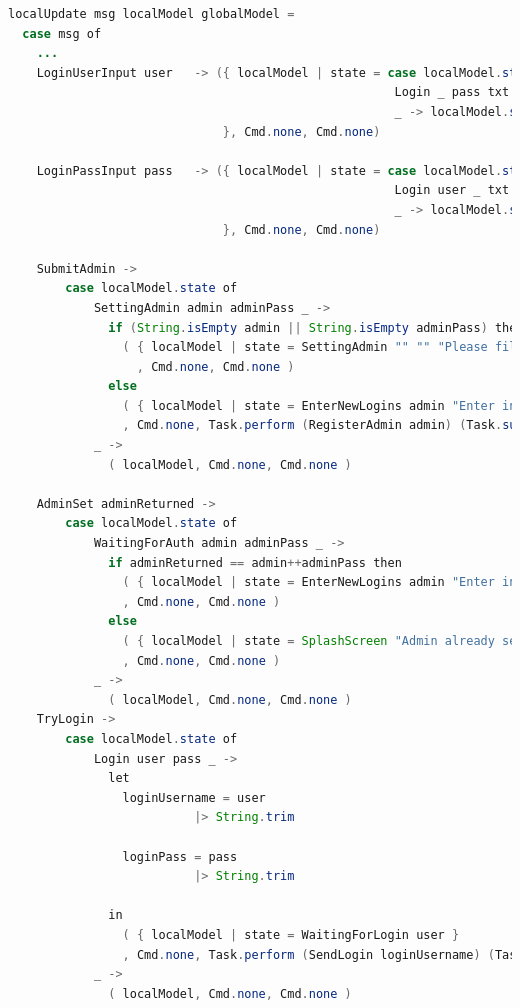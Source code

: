 \begin{lstlisting}[language=Java, caption= TEASync Admin User Setup, label=lst:java, mathescape=true]
localUpdate msg localModel globalModel = 
  case msg of
    ...
    LoginUserInput user   -> ({ localModel | state = case localModel.state of
                                                      Login _ pass txt -> Login user pass txt
                                                      _ -> localModel.state 
                              }, Cmd.none, Cmd.none)
                              
    LoginPassInput pass   -> ({ localModel | state = case localModel.state of
                                                      Login user _ txt -> Login user pass txt
                                                      _ -> localModel.state 
                              }, Cmd.none, Cmd.none)

    SubmitAdmin ->
        case localModel.state of
            SettingAdmin admin adminPass _ -> 
              if (String.isEmpty admin || String.isEmpty adminPass) then
                ( { localModel | state = SettingAdmin "" "" "Please fill out the required fields!" }
                  , Cmd.none, Cmd.none )
              else
                ( { localModel | state = EnterNewLogins admin "Enter initial logins." "" }
                , Cmd.none, Task.perform (RegisterAdmin admin) (Task.succeed adminPass) )
            _ ->
              ( localModel, Cmd.none, Cmd.none )
    
    AdminSet adminReturned ->
        case localModel.state of
            WaitingForAuth admin adminPass _ ->
              if adminReturned == admin++adminPass then
                ( { localModel | state = EnterNewLogins admin "Enter initial logins." "" }
                , Cmd.none, Cmd.none )
              else
                ( { localModel | state = SplashScreen "Admin already set!" }
                , Cmd.none, Cmd.none )
            _ ->
              ( localModel, Cmd.none, Cmd.none )
    TryLogin ->
        case localModel.state of
            Login user pass _ ->
              let
                loginUsername = user
                          |> String.trim
            
                loginPass = pass
                          |> String.trim
                          
              in
                ( { localModel | state = WaitingForLogin user }
                , Cmd.none, Task.perform (SendLogin loginUsername) (Task.succeed loginPass) )
            _ ->
              ( localModel, Cmd.none, Cmd.none )
\end{lstlisting}

